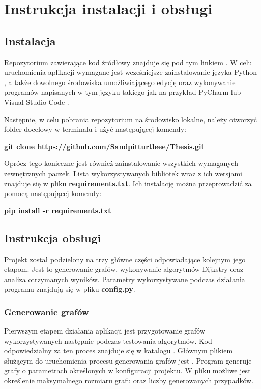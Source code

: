 \chapter{Instrukcja instalacji i obsługi}

\section{Instalacja}

Repozytorium zawierające kod źródłowy znajduje się pod tym linkiem \cite{repo}. W celu uruchomienia aplikacji wymagane jest wcześniejsze zainstalowanie języka Python \cite{python}, a także dowolnego środowiska umożliwiającego edycję oraz wykonywanie programów napisanych w tym języku takiego jak na przykład PyCharm \cite{pycharm} lub Visual Studio Code \cite{visualstudiocode}. 

Następnie, w celu pobrania repozytorium na środowisko lokalne, należy otworzyć folder docelowy w terminalu i użyć następującej komendy:

\hfill \break
\textbf{git clone https://github.com/Sandpitturtleee/Thesis.git}\newline
\hfill 

Oprócz tego konieczne jest również zainstalowanie wszystkich wymaganych zewnętrznych paczek. Lista wykorzystywanych bibliotek wraz z ich wersjami znajduje się w pliku \textbf{requirements.txt}. Ich instalację można przeprowadzić za pomocą następującej komendy:

\hfill \break
\textbf{pip install -r requirements.txt}\newline
\hfill 

\section{Instrukcja obsługi}

Projekt został podzielony na trzy główne części odpowiadające kolejnym jego etapom. Jest to generowanie grafów, wykonywanie algorytmów Dijkstry oraz analiza otrzymanych wyników. Parametry wykorzystywane podczas działania programu znajdują się w pliku \textbf{config.py}.

\subsection{Generowanie grafów}

Pierwszym etapem działania aplikacji jest przygotowanie grafów wykorzystywanych następnie podczas testowania algorytmów. Kod odpowiedzialny za ten proces znajduje się w katalogu . Głównym plikiem służącym do uruchomienia procesu generowania grafów jest . Program generuje grafy o parametrach określonych w konfiguracji projektu. W pliku  możliwe jest określenie maksymalnego rozmiaru grafu oraz liczby generowanych przypadków. 

